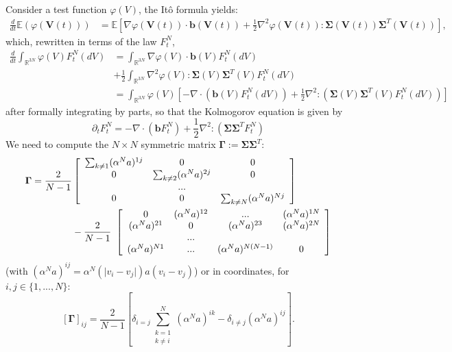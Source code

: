 \documentclass[11pt,a4paper]{article}
\theoremstyle{definition}
\theoremstyle{plain}
\newcommand{\bd}[1]{\mathbf{#1}}
\begin{document}
Consider a test function $\varphi(V)$, the Itô formula yields:
\begin{align*}
    \frac{d}{dt}\mathbb{E}(\varphi(\bd{V}(t)))&=\mathbb{E}\left[\nabla \varphi(\bd{V}(t)) \cdot\bd{b}(\bd{V}(t)) + \frac{1}{2}\nabla^2 \varphi(\bd{V}(t)): \bd{\Sigma}(\bd{V}(t)) \bd{\Sigma}^T(\bd{V}(t))\right],
\end{align*}
which, rewritten in terms of the law $F^N_t$,
\begin{align*}
    \frac{d}{dt}\int_{\mathbb{R}^{3N}}\varphi(V)F^N_t(dV)&=\int_{\mathbb{R}^{3N}}\nabla \varphi(V) \cdot\bd{b}(V) F^N_t(dV)\\
    &+ \frac{1}{2}\int_{\mathbb{R}^{3N}}\nabla^2 \varphi(V): \bd{\Sigma} (V)\bd{\Sigma}^T(V) F^N_t(dV)\\
    &=\int_{\mathbb{R}^{3N}}\varphi(V) \left[-\nabla \cdot(\bd{b}(V) F^N_t(dV)) + \frac{1}{2}\nabla^2:( \bd{\Sigma} (V)\bd{\Sigma}^T(V) F^N_t(dV))\right]
\end{align*}
after formally integrating by parts, so that the Kolmogorov equation is given by
\begin{equation}
\label{eq:kolgeneral}
    \partial_t F^N_t = - \nabla \cdot (\bd{b} F^N_t) + \frac{1}{2}\nabla^2: (\bd{\Sigma} \bd{\Sigma}^T F^N_t)
\end{equation}
We need to compute the $N\times N$ symmetric matrix $\bd{\Gamma}:=\bd{\Sigma} \bd{\Sigma}^T$:
\begin{align*}
     \bd{\Gamma} = \frac{2}{N-1}
    &\left[\begin{array}{c c c}
   \sum_{k\neq 1} (\alpha^Na)^{1j}  & 0 & 0\\
   0 & \sum_{k\neq 2} (\alpha^Na)^{2j} &  0 \\
   &...& \\
   0 & 0 & \sum_{k\neq N} (\alpha^Na)^{Nj}
\end{array}\right] \\&-\frac{2}{N-1}\
\left[\begin{array}{cccc}
   0  & (\alpha^Na)^{12} & ... & (\alpha^Na)^{1N} \\
   (\alpha^Na)^{21}  & 0 & (\alpha^Na)^{23} & (\alpha^Na)^{2N} \\
   &...& \\
   (\alpha^Na)^{N1}  & ... & (\alpha^Na)^{N(N-1)} & 0
\end{array}\right]
\end{align*}
(with $(\alpha^Na)^{ij}=\alpha^N(\vert v_i-v_j\vert)a(v_i-v_j)$) or in coordinates, for $i,j\in\{1,...,N\}$:
$$[\bd{\Gamma}]_{ij}=\frac{2}{N-1} \left[ \delta_{i=j} \sum_{\substack{k=1\\k\neq i}}^N (\alpha^Na)^{ik} - \delta_{i\neq j}(\alpha^Na)^{ij} \right].$$
\end{document}
